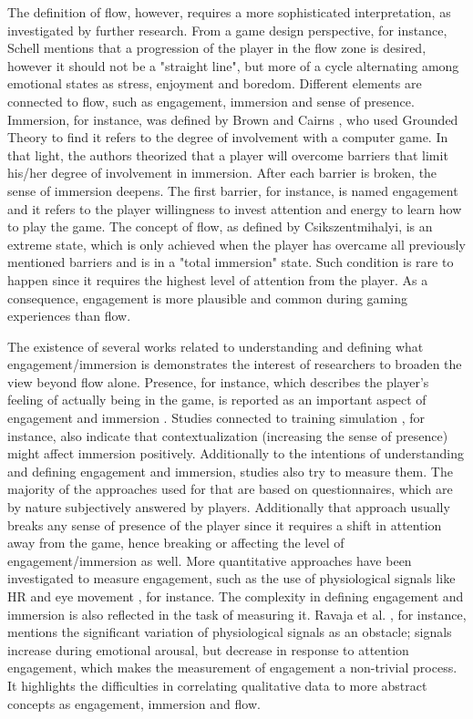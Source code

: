 The definition of flow, however, requires a more sophisticated interpretation, as investigated by further research. From a game design perspective, for instance, Schell \parencite{schell2014art} mentions that a progression of the player in the flow zone is desired, however it should not be a "straight line", but more of a cycle alternating among emotional states as stress, enjoyment and boredom. Different elements are connected to flow, such as engagement, immersion and sense of presence. Immersion, for instance, was defined by Brown and Cairns \parencite{brown2004grounded}, who used Grounded Theory to find it refers to the degree of involvement with a computer game. In that light, the authors theorized that a player will overcome barriers that limit his/her degree of involvement in immersion. After each barrier is broken, the sense of immersion deepens. The first barrier, for instance, is named engagement and it refers to the player willingness  to invest attention and energy to learn how to play the game. The concept of flow, as defined by Csikszentmihalyi, is an extreme state, which is only achieved when the player has overcame all previously mentioned barriers and is in a "total immersion" state. Such condition is rare to happen since it requires the highest level of attention from the player. As a consequence, engagement is more plausible and common during gaming experiences than flow.

The existence of several works \parencite{boyle2012engagement} related to understanding and defining what engagement/immersion is demonstrates the interest of researchers to broaden the view beyond flow alone. Presence, for instance, which describes the player's feeling of actually being in the game, is reported as an important aspect of engagement and immersion \parencite{weibel2011immersion}. Studies connected to training simulation \parencite{engstrom2016impact}, for instance, also indicate that contextualization (increasing the sense of presence) might affect immersion positively. Additionally to the intentions of understanding and defining engagement and immersion, studies also try to measure them. The majority of the approaches used for that are based on questionnaires, which are by nature subjectively answered by players. Additionally that approach usually breaks any sense of presence of the player since it requires a shift in attention away from the game, hence breaking or affecting the level of engagement/immersion as well. More quantitative approaches have been investigated to measure engagement, such as the use of physiological signals like HR \parencite{ravaja20051} and eye movement \parencite{jennett2008measuring}, for instance. The complexity in defining engagement and immersion is also reflected in the task of measuring it. Ravaja et al. \parencite{ravaja20051}, for instance, mentions the significant variation of physiological signals as an obstacle; signals increase during emotional arousal, but decrease in response to attention engagement, which makes the measurement of engagement a non-trivial process. It highlights the difficulties in correlating qualitative data to more abstract concepts as engagement, immersion and flow.

